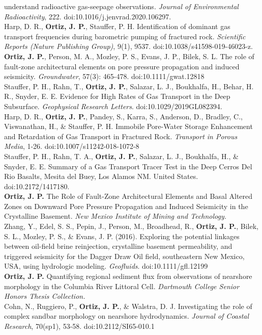 \documentclass[11pt, letterpaper]{article}
\newcommand{\years}[1]{\marginnote{\scriptsize #1}}
\begin{document}
understand radioactive gas-seepage observations. \emph{Journal of Environmental
Radioactivity}, 222. doi:10.1016/j.jenvrad.2020.106297.\\
\years{2019}Harp, D. R., \textbf{Ortiz, J. P.}, Stauffer, P. H. Identification
of dominant gas transport frequencies during barometric pumping of fractured
rock. \emph{Scientific Reports (Nature Publishing Group)}, 9(1), 9537.
doi:10.1038/s41598-019-46023-z. \\ 
\years{2019}\textbf{Ortiz, J. P.}, Person,
M. A., Mozley, P. S., Evans, J. P., Bilek, S. L. The role of fault-zone
architectural elements on pore pressure propagation and induced seismicity.
\emph{Groundwater}, 57(3): 465-478. doi:10.1111/gwat.12818\\
\years{2019}Stauffer, P. H., Rahn, T., \textbf{Ortiz, J. P.}, Salazar, L. J.,
Boukhalfa, H., Behar, H. R., Snyder, E. E. Evidence for High Rates of Gas
Transport in the Deep Subsurface. \emph{Geophysical Research Letters}.
doi:10.1029/2019GL082394.\\ 
\years{2018}Harp, D. R., \textbf{Ortiz, J. P.},
Pandey, S., Karra, S., Anderson, D., Bradley, C., Viswanathan, H., \& Stauffer,
P. H. Immobile Pore-Water Storage Enhancement and Retardation of Gas Transport
in Fractured Rock. \emph{Transport in Porous Media}, 1-26.
doi:10.1007/s11242-018-1072-8\\ 
\years{2018}Stauffer, P. H., Rahn, T. A.,
\textbf{Ortiz, J. P.}, Salazar, L. J., Boukhalfa, H., \& Snyder, E. E. Summary
of a Gas Transport Tracer Test in the Deep Cerros Del Rio Basalts, Mesita del
Buey, Los Alamos NM. United States. doi:10.2172/1417180.\\
\years{2017}\textbf{Ortiz, J. P.} The Role of Fault-Zone Architectural Elements
and Basal Altered Zones on Downward Pore Pressure Propagation and Induced
Seismicity in the Crystalline Basement. \emph{New Mexico Institute of Mining
and Technology.}\\ 
\years{2016}Zhang, Y., Edel, S. S., Pepin, J., Person, M.,
Broadhead, R., \textbf{Ortiz, J. P.}, Bilek, S. L., Mozley, P. S., \& Evans, J.
P. (2016). Exploring the potential linkages between oil-field brine
reinjection, crystalline basement permeability, and triggered seismicity for
the Dagger Draw Oil field, southeastern New Mexico, USA, using hydrologic
modeling. \emph{Geofluids}. doi:10.1111/gfl.12199\\
\years{2014}\textbf{Ortiz, J. P.} Quantifying regional sediment flux from
observations of nearshore morphology in the Columbia River Littoral Cell.
\emph{Dartmouth College Senior Honors Thesis Collection.}\\ 
\years{2014}Cohn, N., Ruggiero, P., \textbf{Ortiz, J. P.}, \& Walstra, D. J.
Investigating the role of complex sandbar morphology on nearshore
hydrodynamics. \emph{Journal of Coastal Research}, 70(sp1), 53-58.
doi:10.2112/SI65-010.1
\end{document}
